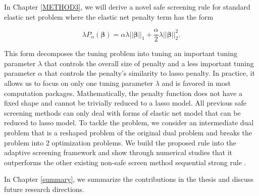In Chapter \ref{METHOD3}, we will derive a novel safe screening rule for standard elastic net problem where the elastic net penalty term has the form

\begin{equation}
    \lambda P_\alpha(\boldsymbol\beta)=\alpha \lambda ||\boldsymbol\beta||_1+\frac{\alpha}{2}\lambda||\boldsymbol\beta||_2^2.
\end{equation}

This form decomposes the tuning problem into tuning an important tuning parameter $\lambda$ that controls the overall size of penalty and a less important tuning parameter $\alpha$ that controls the penalty's similarity to lasso penalty. In practice, it allows us to focus on only one tuning parameter $\lambda$ and is favored in most computation packages. Mathematically, the penalty function does not have a fixed shape and cannot be trivially reduced to a lasso model. All previous safe screening methods can only deal with forms of elastic net model that can be reduced to lasso model. To tackle the problem, we consider an intermediate dual problem that is a reshaped problem of the original dual problem and breaks the problem into 2 optimization problems. We build the proposed rule into the adaptive screening framework and show through numerical studies that it outperforms the other existing non-safe screen method sequential strong rule \citep{Tibshirani2012}.

In Chapter \ref{summary}, we summarize the contributions in the thesis and discuss future research directions.